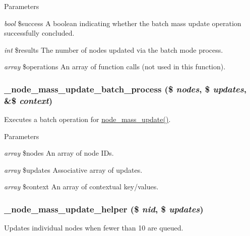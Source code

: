 \begin{DoxyParams}{Parameters}
\item[{\em bool}]\$success A boolean indicating whether the batch mass update operation successfully concluded. \item[{\em int}]\$results The number of nodes updated via the batch mode process. \item[{\em array}]\$operations An array of function calls (not used in this function). \end{DoxyParams}
\hypertarget{node_8admin_8inc_a5960eac661f3d304ee9861fa25c53d80}{
\subsubsection[{\_\-node\_\-mass\_\-update\_\-batch\_\-process}]{\setlength{\rightskip}{0pt plus 5cm}\_\-node\_\-mass\_\-update\_\-batch\_\-process (\$ {\em nodes}, \/  \$ {\em updates}, \/  \&\$ {\em context})}}
\label{node_8admin_8inc_a5960eac661f3d304ee9861fa25c53d80}
Executes a batch operation for \hyperlink{node_8admin_8inc_ab40a38d08f170c418b0dac544d8ba97c}{node\_\-mass\_\-update()}.


\begin{DoxyParams}{Parameters}
\item[{\em array}]\$nodes An array of node IDs. \item[{\em array}]\$updates Associative array of updates. \item[{\em array}]\$context An array of contextual key/values. \end{DoxyParams}
\hypertarget{node_8admin_8inc_a664540e1e689d8cdd4850bb7cb498a09}{
\subsubsection[{\_\-node\_\-mass\_\-update\_\-helper}]{\setlength{\rightskip}{0pt plus 5cm}\_\-node\_\-mass\_\-update\_\-helper (\$ {\em nid}, \/  \$ {\em updates})}}
\label{node_8admin_8inc_a664540e1e689d8cdd4850bb7cb498a09}
Updates individual nodes when fewer than 10 are queued.


